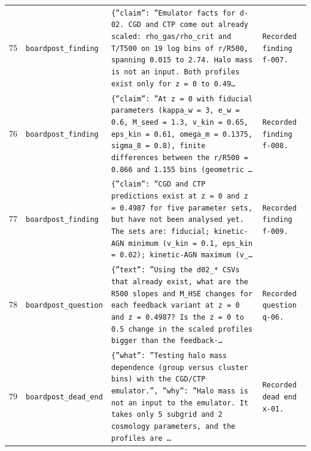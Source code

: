 \documentclass[11pt,a4paper]{article}
\begin{document}
\begin{longtable}{@{}p{}p{}p{}p{}@{}}
75 & \texttt{board}\newline\texttt{post\_\allowbreak{}finding} & \texttt{\{''claim'':\allowbreak{} ''Emulator facts for d-02. CGD and CTP come out already scaled:\allowbreak{} rho\_\allowbreak{}gas/\allowbreak{}rho\_\allowbreak{}crit and T/\allowbreak{}T500 on 19 log bins of r/\allowbreak{}R500,\allowbreak{} spanning 0.015 to 2.74. Halo mass is not an input. Both profiles exist only for z =\allowbreak{} 0 to 0.49\ldots{}\allowbreak{}} & \texttt{Recorded finding f-007.} \\
76 & \texttt{board}\newline\texttt{post\_\allowbreak{}finding} & \texttt{\{''claim'':\allowbreak{} ''At z =\allowbreak{} 0 with fiducial parameters (kappa\_\allowbreak{}w =\allowbreak{} 3,\allowbreak{} e\_\allowbreak{}w =\allowbreak{} 0.6,\allowbreak{} M\_\allowbreak{}seed =\allowbreak{} 1.3,\allowbreak{} v\_\allowbreak{}kin =\allowbreak{} 0.65,\allowbreak{} eps\_\allowbreak{}kin =\allowbreak{} 0.61,\allowbreak{} omega\_\allowbreak{}m =\allowbreak{} 0.1375,\allowbreak{} sigma\_\allowbreak{}8 =\allowbreak{} 0.8)\allowbreak{},\allowbreak{} finite differences between the r/\allowbreak{}R500 =\allowbreak{} 0.866 and 1.155 bins (geometric \ldots{}\allowbreak{}} & \texttt{Recorded finding f-008.} \\
77 & \texttt{board}\newline\texttt{post\_\allowbreak{}finding} & \texttt{\{''claim'':\allowbreak{} ''CGD and CTP predictions exist at z =\allowbreak{} 0 and z =\allowbreak{} 0.4987 for five parameter sets,\allowbreak{} but have not been analysed yet. The sets are:\allowbreak{} fiducial;\allowbreak{} kinetic-AGN minimum (v\_\allowbreak{}kin =\allowbreak{} 0.1,\allowbreak{} eps\_\allowbreak{}kin =\allowbreak{} 0.02)\allowbreak{};\allowbreak{} kinetic-AGN maximum (v\_\allowbreak{}\ldots{}\allowbreak{}} & \texttt{Recorded finding f-009.} \\
78 & \texttt{board}\newline\texttt{post\_\allowbreak{}question} & \texttt{\{''text'':\allowbreak{} ''Using the d02\_\allowbreak{}* CSVs that already exist,\allowbreak{} what are the R500 slopes and M\_\allowbreak{}HSE changes for each feedback variant at z =\allowbreak{} 0 and z =\allowbreak{} 0.4987? Is the z =\allowbreak{} 0 to 0.5 change in the scaled profiles bigger than the feedback-\ldots{}\allowbreak{}} & \texttt{Recorded question q-06.} \\
79 & \texttt{board}\newline\texttt{post\_\allowbreak{}dead\_\allowbreak{}end} & \texttt{\{''what'':\allowbreak{} ''Testing halo mass dependence (group versus cluster bins)\allowbreak{} with the CGD/\allowbreak{}CTP emulator.'',\allowbreak{} ''why'':\allowbreak{} ''Halo mass is not an input to the emulator. It takes only 5 subgrid and 2 cosmology parameters,\allowbreak{} and the profiles are \ldots{}\allowbreak{}} & \texttt{Recorded dead end x-01.} \\

\end{longtable}
\end{document}

